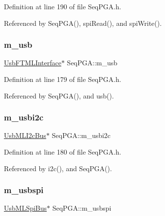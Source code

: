 Definition at line 190 of file Seq\+P\+G\+A.\+h.



Referenced by Seq\+P\+G\+A(), spi\+Read(), and spi\+Write().

\mbox{\label{classSeqPGA_a3df81bbe0e75a1287aa6fe9d33ea27f5}} 
\subsubsection{\texorpdfstring{m\+\_\+usb}{m\_usb}}
{\footnotesize\ttfamily \hyperlink{classUsbFTMLInterface}{Usb\+F\+T\+M\+L\+Interface}$\ast$ Seq\+P\+G\+A\+::m\+\_\+usb\hspace{0.3cm}{\ttfamily [private]}}



Definition at line 179 of file Seq\+P\+G\+A.\+h.



Referenced by Seq\+P\+G\+A(), and usb().

\mbox{\label{classSeqPGA_a31d692cdc2f70dfd71671f3e2d688e20}} 
\subsubsection{\texorpdfstring{m\+\_\+usbi2c}{m\_usbi2c}}
{\footnotesize\ttfamily \hyperlink{classUsbMLI2cBus}{Usb\+M\+L\+I2c\+Bus}$\ast$ Seq\+P\+G\+A\+::m\+\_\+usbi2c\hspace{0.3cm}{\ttfamily [private]}}



Definition at line 180 of file Seq\+P\+G\+A.\+h.



Referenced by i2c(), and Seq\+P\+G\+A().

\mbox{\label{classSeqPGA_aeb7d559e042bced959366125781cef39}} 
\subsubsection{\texorpdfstring{m\+\_\+usbspi}{m\_usbspi}}
{\footnotesize\ttfamily \hyperlink{classUsbMLSpiBus}{Usb\+M\+L\+Spi\+Bus}$\ast$ Seq\+P\+G\+A\+::m\+\_\+usbspi\hspace{0.3cm}{\ttfamily [private]}}



